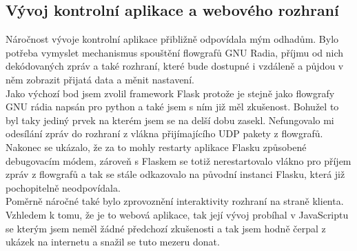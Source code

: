 \documentclass{ctuthesis}
\begin{document}
\subsection{Vývoj kontrolní aplikace a webového rozhraní}
Náročnost vývoje kontrolní aplikace přibližně odpovídala mým odhadům. Bylo potřeba vymyslet mechanismus spouštění flowgrafů GNU Radia, příjmu od nich dekódovaných zpráv a také rozhraní, které bude dostupné i vzdáleně a půjdou v něm zobrazit přijatá data a měnit nastavení. \\
Jako výchozí bod jsem zvolil framework Flask protože je stejně jako flowgrafy GNU rádia napsán pro python a také jsem s ním již měl zkušenost. Bohužel to byl taky jediný prvek na kterém jsem se na delší dobu zasekl. Nefungovalo mi odesílání zpráv do rozhraní z vlákna přijímajícího UDP pakety z flowgrafů. Nakonec se ukázalo, že za to mohly restarty aplikace Flasku způsobené debugovacím módem, zároveň s Flaskem se totiž nerestartovalo vlákno pro příjem zpráv z flowgrafů a tak se stále odkazovalo na původní instanci Flasku, která již pochopitelně neodpovídala.
\\ Poměrně náročné také bylo zprovoznění interaktivity rozhraní na straně klienta. Vzhledem k tomu, že je to webová aplikace, tak její vývoj probíhal v JavaScriptu se kterým jsem neměl žádné předchozí zkušenosti a tak jsem hodně čerpal z ukázek na internetu a snažil se tuto mezeru donat.
\end{document}
